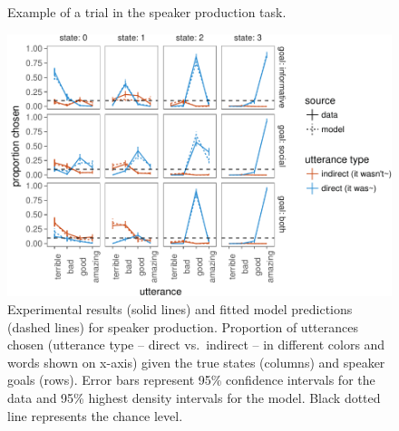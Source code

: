 \documentclass[12pt]{article}
\begin{document}
\begin{figure}
\centering
\caption{\label{fig:exp} Example of a trial in the speaker production task. 
}
\end{figure}

\begin{figure}
\centering
\includegraphics{fig/utterancePrediction-1.pdf}
\caption{\label{fig:utterancePrediction}Experimental results (solid lines) and fitted model predictions (dashed lines) for speaker production.
Proportion of utterances chosen (utterance type -- direct vs.~indirect -- in different colors and words shown on x-axis) given the true states (columns) and speaker goals (rows). Error bars represent 95\% confidence intervals for the data and 95\% highest density intervals for the model.
Black dotted line represents the chance level.}
\end{figure}
\end{document}
